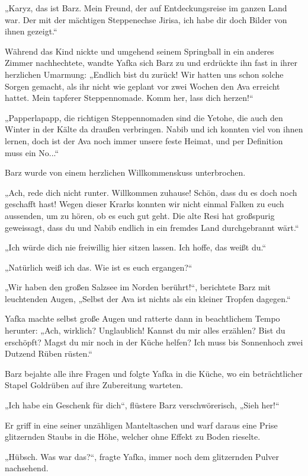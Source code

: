 „Karyz, das ist Barz. Mein Freund, der auf Entdeckungsreise im ganzen Land war. Der mit der mächtigen Steppenechse Jirisa, ich habe dir doch Bilder von ihnen gezeigt.“

Während das Kind nickte und umgehend seinem Springball in ein anderes Zimmer nachhechtete, wandte Yafka sich Barz zu und erdrückte ihn fast in ihrer herzlichen Umarmung: „Endlich bist du zurück! Wir hatten uns schon solche Sorgen gemacht, als ihr nicht wie geplant vor zwei Wochen den Ava erreicht hattet. Mein tapferer Steppennomade. Komm her, lass dich herzen!“

„Papperlapapp, die richtigen Steppennomaden sind die Yetohe, die auch den Winter in der Kälte da draußen verbringen. Nabib und ich konnten viel von ihnen lernen, doch ist der Ava noch immer unsere feste Heimat, und per Definition muss ein No...“

Barz wurde von einem herzlichen Willkommenskuss unterbrochen.

„Ach, rede dich nicht runter. Willkommen zuhause! Schön, dass du es doch noch geschafft hast! Wegen dieser Krarks konnten wir nicht einmal Falken zu euch aussenden, um zu hören, ob es euch gut geht. Die alte Resi hat großspurig geweissagt, dass du und Nabib endlich in ein fremdes Land durchgebrannt wärt.“

„Ich würde dich nie freiwillig hier sitzen lassen. Ich hoffe, das weißt du.“

„Natürlich weiß ich das. Wie ist es euch ergangen?“

„Wir haben den großen Salzsee im Norden berührt!“, berichtete Barz mit leuchtenden Augen, „Selbst der Ava ist nichts als ein kleiner Tropfen dagegen.“

Yafka machte selbst große Augen und ratterte dann in beachtlichem Tempo herunter: „Ach, wirklich? Unglaublich! Kannst du mir alles erzählen? Bist du erschöpft? Magst du mir noch in der Küche helfen? Ich muss bis Sonnenhoch zwei Dutzend Rüben rüsten.“

Barz bejahte alle ihre Fragen und folgte Yafka in die Küche, wo ein beträchtlicher Stapel Goldrüben auf ihre Zubereitung warteten.

„Ich habe ein Geschenk für dich“, flüstere Barz verschwörerisch, „Sieh her!“

Er griff in eine seiner unzähligen Manteltaschen und warf daraus eine Prise glitzernden Staubs in die Höhe, welcher ohne Effekt zu Boden rieselte.

„Hübsch. Was war das?“, fragte Yafka, immer noch dem glitzernden Pulver nachsehend.

